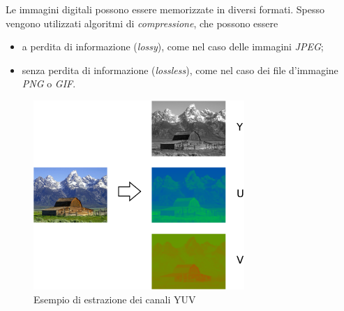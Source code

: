 Le immagini digitali possono essere memorizzate in diversi formati.
Spesso vengono utilizzati algoritmi di \textit{compressione}, che possono essere
\begin{itemize}
	\item a perdita di informazione (\textit{lossy}), come nel caso delle immagini \textit{JPEG};
	\item senza perdita di informazione (\textit{lossless}), come nel caso dei file d'immagine \textit{PNG} o \textit{GIF}.
\end{itemize}
	\begin{figure}[tb]
		\centering
		\includegraphics[width=8cm]{./pictures/yuv}
		\caption{Esempio di estrazione dei canali YUV}
		\label{fig:yuv}
	\end{figure}
